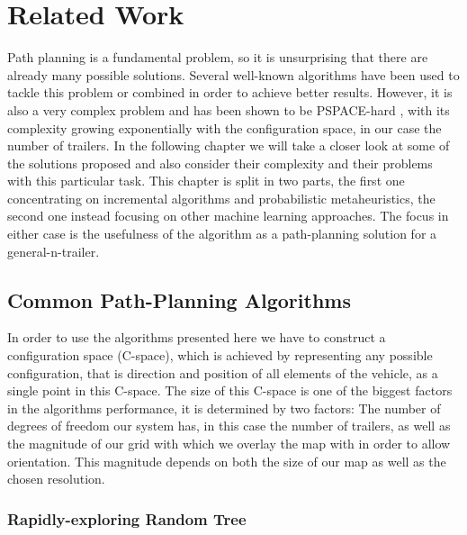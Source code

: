 \chapter{Related Work}
\label{cha:related_work}

Path planning is a fundamental problem, so it is unsurprising that there are already many possible solutions. Several well-known algorithms have been used to tackle this problem or combined in order to achieve better results. However, it is also a very complex problem and has been shown to be PSPACE-hard \cite{39}, with its complexity growing exponentially with the configuration space, in our case the number of trailers. \cite{1} In the following chapter we will take a closer look at some of the solutions proposed and also consider their complexity and their problems with this particular task. This chapter is split in two parts, the first one concentrating on incremental algorithms and probabilistic metaheuristics, the second one instead focusing on other machine learning approaches. The focus in either case is the usefulness of the algorithm as a path-planning solution for a general-n-trailer. \pagebreak[4]

\section{Common Path-Planning Algorithms}
\label{sec:common_pathplanning}

In order to use the algorithms presented here we have to construct a configuration space (C-space), which is achieved by representing any possible configuration, that is direction and position of all elements of the vehicle, as a single point in this C-space. The size of this C-space is one of the biggest factors in the algorithms performance, it is determined by two factors: The number of degrees of freedom our system has, in this case the number of trailers, as well as the magnitude of our grid with which we overlay the map with in order to allow orientation. This magnitude depends on both the size of our map as well as the chosen resolution.

\subsection{Rapidly-exploring Random Tree}
\label{sec:rrt}


